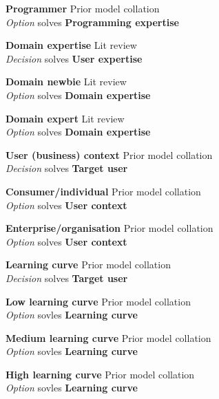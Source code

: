 \textbf{Programmer} \hfill Prior model collation \cite{Aghaee2012,Patel2010,Pietschmann2010} \\ \emph{Option} \hfill solves \textbf{Programming expertise}

\textbf{Domain expertise} \hfill Lit review \cite{Silva2008} \\ \emph{Decision} \hfill solves \textbf{User expertise}

\textbf{Domain newbie} \hfill Lit review \cite{Silva2008} \\ \emph{Option} \hfill solves \textbf{Domain expertise}

\textbf{Domain expert} \hfill Lit review \cite{Silva2008} \\ \emph{Option} \hfill solves \textbf{Domain expertise}

\textbf{User (business) context} \hfill Prior model collation \cite{Minhas2012} \\ \emph{Decision} \hfill solves \textbf{Target user}

\textbf{Consumer/individual} \hfill Prior model collation \cite{Minhas2012,Patel2010} \\ \emph{Option} \hfill solves \textbf{User context}

\textbf{Enterprise/organisation} \hfill Prior model collation \cite{Minhas2012,Patel2010} \\ \emph{Option} \hfill solves \textbf{User context}

\textbf{Learning curve} \hfill Prior model collation \cite{Minhas2012} \\ \emph{Decision} \hfill solves \textbf{Target user}


\textbf{Low learning curve} \hfill Prior model collation \cite{Minhas2012} \\ \emph{Option} \hfill sovles \textbf{Learning curve}

\textbf{Medium learning curve} \hfill Prior model collation \cite{Minhas2012} \\ \emph{Option} \hfill sovles \textbf{Learning curve}

\textbf{High learning curve} \hfill Prior model collation \cite{Minhas2012} \\ \emph{Option} \hfill sovles \textbf{Learning curve}

